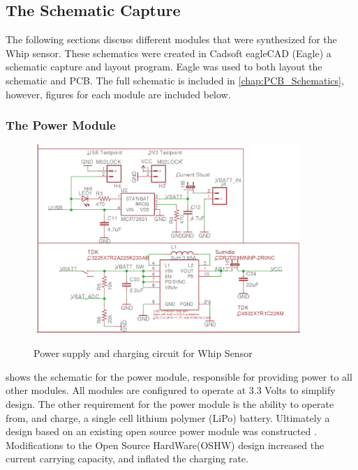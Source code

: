 \subsection {The Schematic Capture}
The following sections discuss different modules that were synthesized for the Whip sensor. These schematics were created in Cadsoft eagleCAD (Eagle)\cite{Eagle2017} a schematic capture and layout program. Eagle was used to both layout the schematic and PCB. The full schematic is included in \cref{chap:PCB_Schematics}, however, figures for each module are included below.

\subsubsection {The Power Module}
\begin{figure}
	\begin{center}
		\label{fig:Rev5_power}
		\includegraphics[scale=1,width=0.9\textwidth]{Images/Rev5_PowerSch.png} 
		\caption{Power supply and charging circuit for Whip Sensor}
	\end{center}
\end{figure}

 shows the schematic for the power module, responsible for providing power to all other modules. All modules are configured to operate at 3.3 Volts to simplify design. The other requirement for the power module is the ability to operate from, and charge, a single cell lithium polymer (LiPo) battery. Ultimately a design based on an existing open source power module was constructed \cite{Sparkfun2012}. Modifications to the Open Source HardWare(OSHW) design increased the current carrying capacity, and inflated the charging rate.


